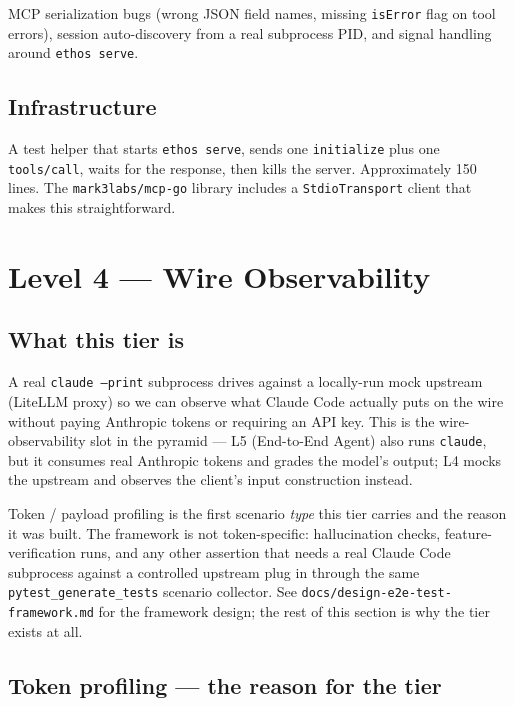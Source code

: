 \documentclass[a4paper,10pt]{article}
\newcommand{\pkg}[1]{\texttt{#1}}
\newcommand{\cmd}[1]{\texttt{#1}}
\newcommand{\fpath}[1]{\texttt{#1}}
\begin{document}
MCP serialization bugs (wrong JSON field names, missing
\texttt{isError} flag on tool errors), session auto-discovery from a
real subprocess PID, and signal handling around \cmd{ethos serve}.

\subsection*{Infrastructure}

A test helper that starts \cmd{ethos serve}, sends one
\texttt{initialize} plus one \texttt{tools/call}, waits for the
response, then kills the server.  Approximately 150 lines.  The
\pkg{mark3labs/mcp-go} library includes a \pkg{StdioTransport} client
that makes this straightforward.

\section{Level 4 --- Wire Observability}

\subsection*{What this tier is}

A real \cmd{claude --print} subprocess drives against a locally-run
mock upstream (LiteLLM proxy) so we can observe what Claude Code
actually puts on the wire without paying Anthropic tokens or
requiring an API key.  This is the wire-observability slot in the
pyramid --- L5 (End-to-End Agent) also runs \cmd{claude}, but it
consumes real Anthropic tokens and grades the model's output; L4
mocks the upstream and observes the client's input construction
instead.

Token / payload profiling is the first scenario \emph{type} this
tier carries and the reason it was built.  The framework is not
token-specific: hallucination checks, feature-verification runs,
and any other assertion that needs a real Claude Code subprocess
against a controlled upstream plug in through the same
\pkg{pytest\_generate\_tests} scenario collector.  See
\fpath{docs/design-e2e-test-framework.md} for the framework
design; the rest of this section is why the tier exists at all.

\subsection*{Token profiling --- the reason for the tier}
\end{document}
